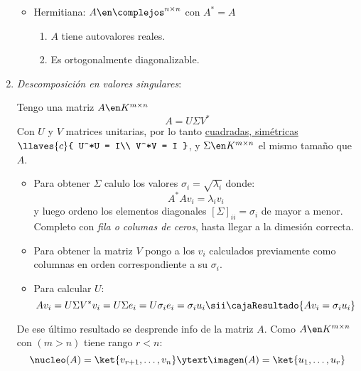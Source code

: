 \begin{enumerate}[label=\tiny\purple{\faIcon{snowman}}]
\begin{minipage}{0.5\textwidth}
\begin{itemize}
            \item Hermitiana: $A \en \complejos^{n \times n}$  con $A^* = A$
                  \begin{enumerate}[label={\tiny\faIcon{atom}}]
                    \item $A$ tiene autovalores reales.
                    \item Es ortogonalmente diagonalizable.
                  \end{enumerate}

          \end{itemize}
        \end{minipage}

  \item \hypertarget{teoria-5:svd}{\textit{Descomposición en valores singulares}:}

        Tengo una matriz $A \en K^{m \times n}$
        $$
          A = U \Sigma V^*
        $$
        Con $U$ y $V$ matrices unitarias, por lo tanto \ul{cuadradas, simétricas}
        $\llaves{c}{
            U^*U = I\\
            V^*V = I
          }$,
        y $\Sigma \en K^{m \times n}$ el mismo tamaño que $A$.
        \begin{itemize}
          \item Para obtener $\Sigma$ calulo los valores $\sigma_i = \sqrt{\lambda_i}$ donde:
                $$
                  A^*A v_i = \lambda_i v_i
                $$
                y luego ordeno los elementos diagonales $[\Sigma]_{ii} = \sigma_i$ de mayor a menor. Completo con \textit{fila o columas de ceros},
                hasta llegar a la dimesión correcta.

          \item Para obtener la matriz $V$ pongo a los $v_i$ calculados previamente como columnas en orden correspondiente a su $\sigma_i$.

          \item Para calcular $U$:
                $$
                  Av_i = U\Sigma V^*v_i =  U\Sigma e_i = U\sigma_i e_i = \sigma_i u_i
                  \sii
                  \cajaResultado{
                    Av_i = \sigma_i u_i
                  }
                $$
        \end{itemize}
        De ese último resultado se desprende info de la matriz $A$. Como $A \en K^{m \times n}$ con $(m > n)$ tiene rango $r < n$:
        $$
          \nucleo(A) = \ket{v_{r+1}, \ldots, v_n}
          \ytext
          \imagen(A) = \ket{u_1, \ldots, u_r}
        $$


\end{enumerate}
